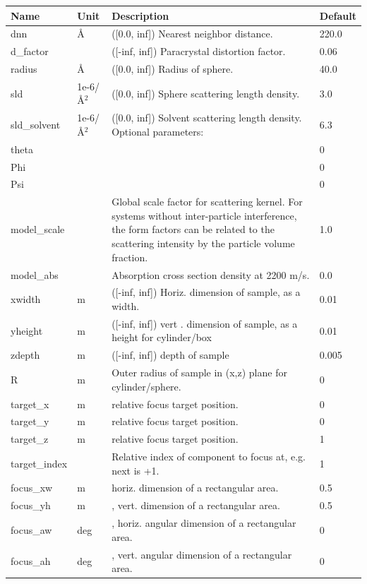 \begin{longtable}{p{}p{}p{}p{}}
\toprule
\textbf{Name} & \textbf{Unit} & \textbf{Description} & \textbf{Default} \\
\midrule
\endhead
dnn & \AA{} & ([0.0, inf]) Nearest neighbor distance. & 220.0 \\
d\_factor &  & ([-inf, inf]) Paracrystal distortion factor. & 0.06 \\
radius & \AA{} & ([0.0, inf]) Radius of sphere. & 40.0 \\
sld & 1e-6/\AA{}$^{2}$ & ([0.0, inf]) Sphere scattering length density. & 3.0 \\
sld\_solvent & 1e-6/\AA{}$^{2}$ & ([0.0, inf]) Solvent scattering length density. Optional parameters: & 6.3 \\
theta &  &  & 0 \\
Phi &  &  & 0 \\
Psi &  &  & 0 \\
model\_scale &   & Global scale factor for scattering kernel. For systems without inter-particle interference, the form factors can be related to the scattering intensity by the particle volume fraction. & 1.0 \\
model\_abs &   & Absorption cross section density at 2200 m/s. & 0.0 \\
xwidth & m & ([-inf, inf]) Horiz. dimension of sample, as a width. & 0.01 \\
yheight & m & ([-inf, inf]) vert . dimension of sample, as a height for cylinder/box & 0.01 \\
zdepth & m & ([-inf, inf]) depth of sample & 0.005 \\
R & m & Outer radius of sample in (x,z) plane for cylinder/sphere. & 0 \\
target\_x & m & relative focus target position. & 0 \\
target\_y & m & relative focus target position. & 0 \\
target\_z & m & relative focus target position. & 1 \\
target\_index &   & Relative index of component to focus at, e.g. next is +1. & 1 \\
focus\_xw & m & horiz. dimension of a rectangular area. & 0.5 \\
focus\_yh & m & , vert. dimension of a rectangular area. & 0.5 \\
focus\_aw & deg & , horiz. angular dimension of a rectangular area. & 0 \\
focus\_ah & deg & , vert. angular dimension of a rectangular area. & 0 \\

\end{longtable}
